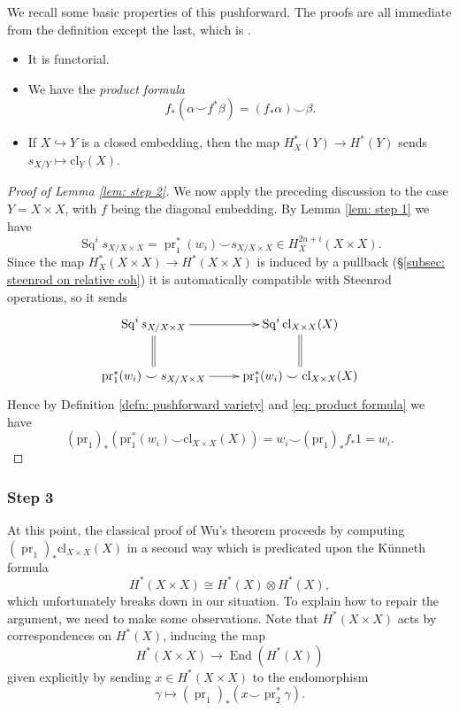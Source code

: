 \documentclass[10pt, reqno]{amsart}
\numberwithin{equation}{subsection}
\newcommand{\F}{\mathbf{F}}
\newcommand{\mrm}[1]{\mathrm{#1}}
\DeclareMathOperator{\et}{\acute{e}t}
\DeclareMathOperator{\Spec}{Spec\,}
\DeclareMathOperator{\End}{End}
\DeclareMathOperator{\Sq}{Sq}
\DeclareMathOperator{\pr}{pr}
\theoremstyle{remark}
\begin{document}
We recall some basic properties of this pushforward. The proofs are all immediate from the definition except the last, which is \cite[Proposition 2.7]{FK88}.
\begin{itemize}
\item It is functorial. 
\item We have the \emph{product formula}
\begin{equation}\label{eq: product formula}
f_*(\alpha \smile f^* \beta) = (f_* \alpha) \smile \beta.
\end{equation}
\item If $X \hookrightarrow Y$ is a closed embedding, then the map $H^*_X(Y) \rightarrow H^*_{\et}(Y)$ sends $s_{X/Y} \mapsto \mrm{cl}_Y(X)$.
\end{itemize}

\begin{proof}[Proof of Lemma \ref{lem: step 2}] We now apply the preceding discussion to the case $Y=X \times X$, with $f$ being the diagonal embedding. By Lemma \ref{lem: step 1} we have  
\[
\Sq^i s_{X/X \times X} = \pr_1^*(w_i) \smile s_{X/X\times X} \in H^{2n+i}_X(X \times X). 
\]
Since the map $H^*_X(X \times X) \rightarrow H_{\et}^*(X \times X)$ is induced by a pullback (\S \ref{subsec: steenrod on relative coh}) it is automatically compatible with Steenrod operations, so it sends
\[
\xymatrix{
\Sq^i s_{X/X \times X} \ar[r] \ar@{=}[d] &  \Sq^i \mrm{cl}_{X \times X}(X) \ar@{=}[d] \\
\mrm{pr}_1^*(w_i) \smile s_{X/X \times X}  \ar[r] & \mrm{pr}_1^*(w_i) \smile \mrm{cl}_{X \times X}(X) 
}
\]
Hence by Definition \ref{defn: pushforward variety} and \eqref{eq: product formula} we have
\[
(\mrm{pr}_1)_* (\mrm{pr}_1^*(w_i) \smile \mrm{cl}_{X \times X}(X) ) = w_i \smile (\mrm{pr}_1)_* f_* 1 = w_i.
\]
\end{proof}


\subsubsection{Step 3}

At this point, the classical proof of Wu's theorem proceeds by computing $(\pr_1)_* \mrm{cl}_{X \times X}(X) $ in a second way which is predicated upon the K\"{u}nneth formula 
\[
H^*_{\et}(X \times X) \cong H^*_{\et}(X) \otimes H^*_{\et}(X),
\]
which unfortunately breaks down in our situation. To explain how to repair the argument, we need to make some observations. Note that $H^*_{\et}(X \times X)$ acts by correspondences on $H^*_{\et}(X)$, inducing the map 
\begin{equation}\label{correspondences}
H^*_{\et}(X \times X) \rightarrow \End  (H^*_{\et}(X))
\end{equation}
given explicitly by sending $x \in H^*_{\et}(X \times X)$ to the endomorphism
\begin{equation}\label{eq: correspondence}
\gamma \mapsto (\pr_1)_* ( x \smile \pr_2^* \gamma ).
\end{equation}
\end{document}
